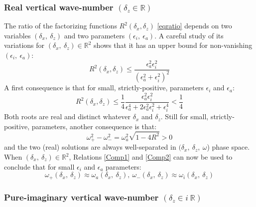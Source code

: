 \documentclass[a4paper,11pt]{article}
\begin{document}
\subsubsection{Real vertical wave-number $(\delta_z\in\mathbb{R})$}

The ratio of the factorizing functions $\displaystyle R^2(\delta_x,\delta_z)$ \ref{eqratio} depends on two variables $(\delta_x,\ \delta_z)$ and two parameters $(\epsilon_i,\ \epsilon_a)$. A careful study of its variations for $(\delta_x,\ \delta_z)\in \mathbb{R}^2$ shows that it has an upper bound for non-vanishing $(\epsilon_i,\ \epsilon_a)$:
\begin{equation}
	 R^2(\delta_x,\delta_z) \leq
	\frac{\epsilon_a^2\epsilon_i^2}{\left
	(\epsilon_a^2+\epsilon_i^2
	\right)^2}
\end{equation}
A first consequence is that for small, strictly-positive, parameters $\epsilon_i$ and $\epsilon_a$:
\begin{equation}
	 R^2(\delta_x,\delta_z) 
	\leq
	\frac{1}{4}
	\frac{\epsilon_a^2\epsilon_i^2}{\epsilon_a^4+2\epsilon_a^2\epsilon_i^2+\epsilon_i^4} 
	<
	\frac{1}{4}
\end{equation}
Both roots are real and distinct whatever $\delta_x$ and $\delta_z$. Still for small, strictly-positive, parameters, another consequence is that:
\begin{equation}
    \omega_{+}^2-\omega_{-}^2 =\omega_a^2\sqrt{1-4 R^2}>0
	\label{deltaomegapm}
\end{equation}
and the two (real) solutions are always well-separated in $(\delta_x,\ \delta_z,\ \omega$) phase space.\\
When $(\delta_x,\ \delta_z)\in \mathbb{R}^2$, Relations \ref{Comp1} and \ref{Comp2} can now be used to conclude that for small $\epsilon_i$ and $\epsilon_a$ parameters:
\begin{equation}
	\omega_{+}(\delta_x,\ \delta_z) \approx \omega_a(\delta_x,\ \delta_z),\ 
	\omega_{-}(\delta_x,\ \delta_z) \approx \omega_i
	(\delta_x,\ \delta_z)
\end{equation}

\subsubsection{Pure-imaginary vertical wave-number $(\delta_z\in i\ 
\mathbb{R})$}
\label{subsubsectioniR}
\end{document}
